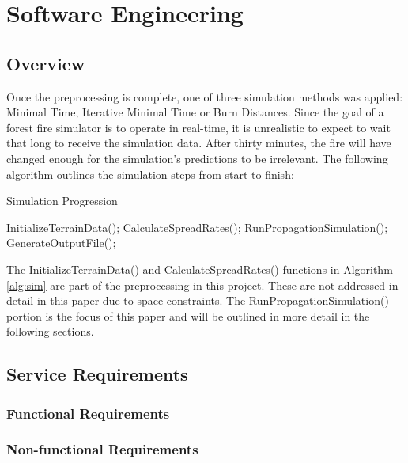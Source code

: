 \chapter{Software Engineering}
\label{chapter:design}

\section{Overview}
Once the preprocessing is complete, one of three simulation methods was applied: Minimal Time, Iterative Minimal Time or Burn Distances. Since the goal of a forest fire simulator is to operate in real-time, it is unrealistic to expect to wait that long to receive the simulation data. After thirty minutes, the fire will have changed enough for the simulation's predictions to be irrelevant. The following algorithm outlines the simulation steps from start to finish:

\begin{algorithm}
  \caption{Simulation Progression}
  \label{alg:sim}
  \begin{algorithmic}
  \STATE InitializeTerrainData();
  \STATE CalculateSpreadRates();
  \STATE RunPropagationSimulation();
  \STATE GenerateOutputFile();
  \end{algorithmic}
\end{algorithm}

The InitializeTerrainData() and CalculateSpreadRates() functions in Algorithm \ref{alg:sim} are part of the preprocessing in this project. These are not addressed in detail in this paper due to space constraints. The RunPropagationSimulation() portion is the focus of this paper and will be outlined in more detail in the following sections.


\section{Service Requirements}

\subsection{Functional Requirements}

\subsection{Non-functional Requirements}
  
